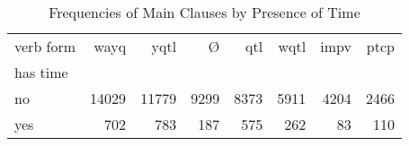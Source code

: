 \begin{table}[htbp!]
\centering
\caption{Frequencies of Main Clauses by Presence of Time}
\label{table:main_verb_ct}
\begin{tabular}{lrrrrrrr}
\toprule
verb form &   wayq &   yqtl &     Ø &   qtl &  wqtl &  impv &  ptcp \\
has time &        &        &       &       &       &       &       \\
\midrule
no       &  14029 &  11779 &  9299 &  8373 &  5911 &  4204 &  2466 \\
yes      &    702 &    783 &   187 &   575 &   262 &    83 &   110 \\
\bottomrule
\end{tabular}
\end{table}
